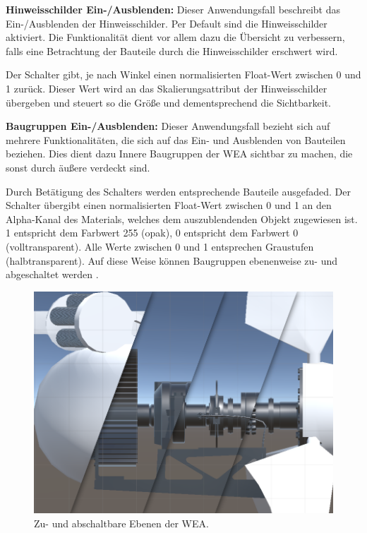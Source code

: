 \textbf{Hinweisschilder Ein-/Ausblenden:} Dieser Anwendungsfall beschreibt das  Ein-/Ausblenden der Hinweisschilder. Per Default sind die Hinweisschilder aktiviert. Die Funktionalität dient vor allem dazu die Übersicht zu verbessern, falls eine Betrachtung der Bauteile durch die Hinweisschilder erschwert wird. 

Der Schalter gibt, je nach Winkel einen normalisierten Float-Wert zwischen 0 und 1 zurück. Dieser Wert wird an das Skalierungsattribut der Hinweisschilder übergeben und steuert so die Größe und dementsprechend die Sichtbarkeit.  

\textbf{Baugruppen Ein-/Ausblenden:} Dieser Anwendungsfall bezieht sich auf mehrere Funktionalitäten, die sich auf das Ein- und Ausblenden von Bauteilen beziehen. Dies dient dazu Innere Baugruppen der WEA sichtbar zu machen, die sonst durch äußere verdeckt sind.

Durch Betätigung des Schalters werden entsprechende Bauteile ausgefaded. Der Schalter übergibt einen normalisierten Float-Wert zwischen 0 und 1 an den Alpha-Kanal des Materials, welches dem auszublendenden Objekt zugewiesen ist. 1 entspricht dem Farbwert 255 (opak), 0 entspricht dem Farbwert 0 (volltransparent). Alle Werte zwischen 0 und 1 entsprechen Graustufen (halbtransparent). Auf diese Weise können Baugruppen ebenenweise zu- und abgeschaltet werden . 

\begin{figure}[H]
	\centering
	\captionsetup{width=1\textwidth}
	\includegraphics[keepaspectratio, width=1\textwidth]{bildquellen/baugruppen_klein}
	\caption{Zu- und abschaltbare Ebenen der WEA.}
	\label{fig:4.2}
\end{figure}


